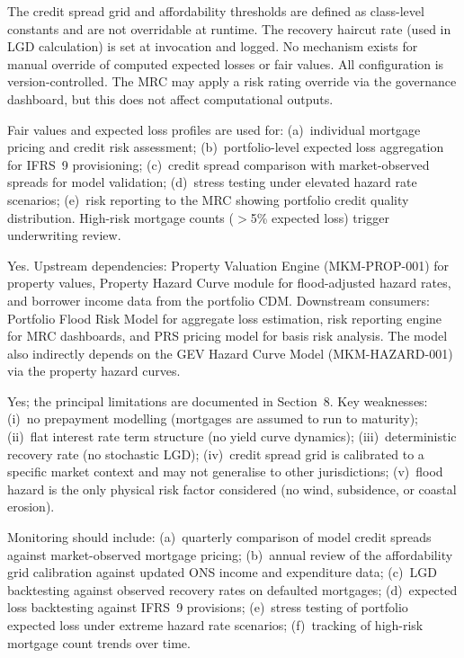 \documentclass[11pt,a4paper]{article}
\begin{document}
The credit spread grid and affordability thresholds are defined as class-level constants and are not overridable at runtime. The recovery haircut rate (used in LGD calculation) is set at invocation and logged. No mechanism exists for manual override of computed expected losses or fair values. All configuration is version-controlled. The MRC may apply a risk rating override via the governance dashboard, but this does not affect computational outputs.

Fair values and expected loss profiles are used for: (a)~individual mortgage pricing and credit risk assessment; (b)~portfolio-level expected loss aggregation for IFRS~9 provisioning; (c)~credit spread comparison with market-observed spreads for model validation; (d)~stress testing under elevated hazard rate scenarios; (e)~risk reporting to the MRC showing portfolio credit quality distribution. High-risk mortgage counts ($>$5\% expected loss) trigger underwriting review.

Yes. Upstream dependencies: Property Valuation Engine (MKM-PROP-001) for property values, Property Hazard Curve module for flood-adjusted hazard rates, and borrower income data from the portfolio CDM. Downstream consumers: Portfolio Flood Risk Model for aggregate loss estimation, risk reporting engine for MRC dashboards, and PRS pricing model for basis risk analysis. The model also indirectly depends on the GEV Hazard Curve Model (MKM-HAZARD-001) via the property hazard curves.

Yes; the principal limitations are documented in Section~8. Key weaknesses: (i)~no prepayment modelling (mortgages are assumed to run to maturity); (ii)~flat interest rate term structure (no yield curve dynamics); (iii)~deterministic recovery rate (no stochastic LGD); (iv)~credit spread grid is calibrated to a specific market context and may not generalise to other jurisdictions; (v)~flood hazard is the only physical risk factor considered (no wind, subsidence, or coastal erosion).

Monitoring should include: (a)~quarterly comparison of model credit spreads against market-observed mortgage pricing; (b)~annual review of the affordability grid calibration against updated ONS income and expenditure data; (c)~LGD backtesting against observed recovery rates on defaulted mortgages; (d)~expected loss backtesting against IFRS~9 provisions; (e)~stress testing of portfolio expected loss under extreme hazard rate scenarios; (f)~tracking of high-risk mortgage count trends over time.
\end{document}
